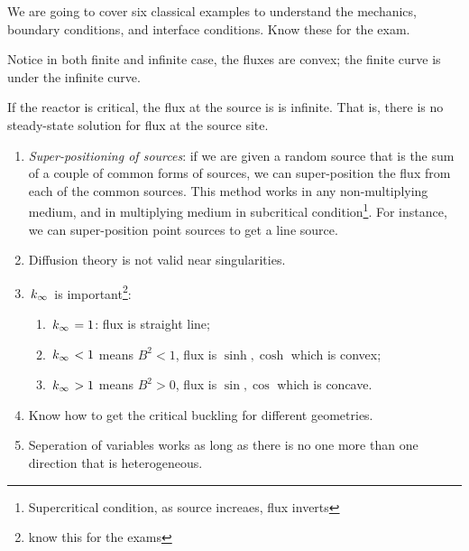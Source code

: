 \documentclass{school-22.211-notes}
\date{April  4, 2012}
\begin{document}
\maketitle

We are going to cover six classical examples to understand the mechanics, boundary conditions, and interface conditions. Know these for the exam. 








Notice in both finite and infinite case, the fluxes are convex; the finite curve is under the infinite curve. 






If the reactor is critical, the flux at the source is is infinite. That is, there is no steady-state solution for flux at the source site. 












\begin{enumerate}
\item \textit{Super-positioning of sources}: if we are given a random source that is the sum of a couple of common forms of sources, we can super-position the flux from each of the common sources. This method works in any non-multiplying medium, and in multiplying medium in subcritical condition\footnote{Supercritical condition, as source increaes, flux inverts}. For instance, we can super-position point sources to get a line source. 
\item Diffusion theory is not valid near singularities. 
\item $\left. k_{\infty} \right.$ is important\footnote{know this for the exams}: 
  \begin{enumerate}
  \item $\left. k_{\infty} \right. = 1$: flux is straight line;
  \item $\left. k_{\infty} \right. < 1$ means $B^2 < 1$, flux is $\sinh, \cosh$ which is convex; 
  \item $\left. k_{\infty} \right. > 1$ means $B^2 > 0$, flux is $\sin, \cos$ which is concave. 
  \end{enumerate}
\item Know how to get the critical buckling for different geometries. 
\item Seperation of variables works as long as there is no one more than one direction that is heterogeneous. 
\end{enumerate}
\end{document}
